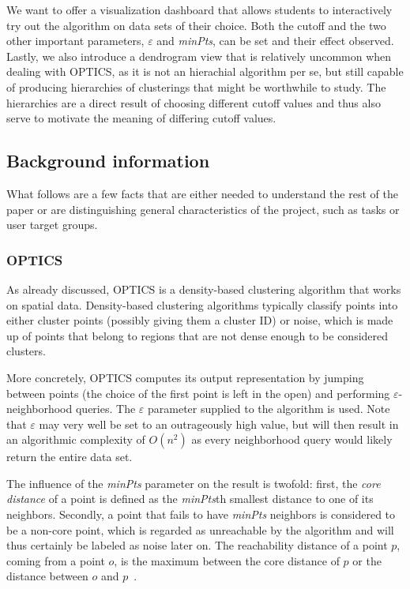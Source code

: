 \documentclass{vgtc} %
\begin{document}
We want to offer a visualization dashboard that allows students to
interactively try out the algorithm on data sets of their choice. Both the
cutoff and the two other important parameters, $\varepsilon$ and \emph{minPts}, can
be set and their effect observed. Lastly, we also introduce a dendrogram view
that is relatively uncommon when dealing with OPTICS, as it is not an hierachial
algorithm per se, but still capable of producing hierarchies of clusterings
that might be worthwhile to study. The hierarchies are a direct result of
choosing different cutoff values and thus also serve to motivate the meaning of
differing cutoff values.

\subsection{Background information}

What follows are a few facts that are either needed to understand the rest
of the paper or are distinguishing general characteristics of the project,
such as tasks or user target groups.


\subsubsection{OPTICS}

As already discussed, OPTICS is a density-based clustering algorithm that works
on spatial data. Density-based clustering algorithms typically classify points
into either cluster points (possibly giving them a cluster ID) or noise, which
is made up of points that belong to regions that are not dense enough to be
considered clusters.

More concretely, OPTICS computes its output representation by jumping between
points (the choice of the first point is left in the open) and performing
$\varepsilon$-neighborhood queries. The $\varepsilon$ parameter supplied to the
algorithm is used. Note that $\varepsilon$ may very well be set to an
outrageously high value, but will then result in an algorithmic complexity of
$O(n^2)$ as every neighborhood query would likely return the entire data set.

The influence of the \emph{minPts} parameter on the result is twofold: first,
the \emph{core distance} of a point is defined as the \emph{minPts}th smallest
distance to one of its neighbors. Secondly, a point that fails to have
\emph{minPts} neighbors is considered to be a non-core point, which is regarded
as unreachable by the algorithm and will thus certainly be labeled as noise
later on. The reachability distance of a point $p$, coming from a point $o$, is
the maximum between the core distance of $p$ or the distance between $o$ and
$p$~\cite{optics-wiki}.
\end{document}
